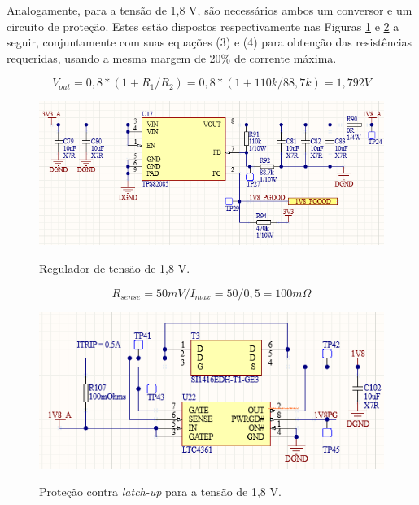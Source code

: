 Analogamente, para a tensão de 1,8 V, são necessários ambos um conversor e um circuito de proteção. Estes estão dispostos respectivamente nas Figuras \ref{fig:1v8supp} e \ref{fig:1v8ocp} a seguir, conjuntamente com suas equações (3) e (4) para obtenção das resistências requeridas, usando a mesma margem de 20\% de corrente máxima. 

\begin{equation}
	V_{out} = 0,8 * (1 + R_1/R_2) = 0,8 * (1+ 110k/88,7k) = 1,792 V
\end{equation} 

\begin{figure}[H]
    \centering
    \caption{Regulador de tensão de 1,8 V.}
    \includegraphics[scale=0.8]{images/1v8supp.png}
    \label{fig:1v8supp}
\end{figure}

\begin{equation}
	R_{sense} = 50 mV / I_{max} =50 / 0,5 = 100 m\Omega
\end{equation} 

\begin{figure}[H]
    \centering
    \caption{Proteção contra \textit{latch-up} para a tensão de 1,8 V.}
    \includegraphics[scale=1]{images/1v8ocp.png}
    \label{fig:1v8ocp}
\end{figure}

